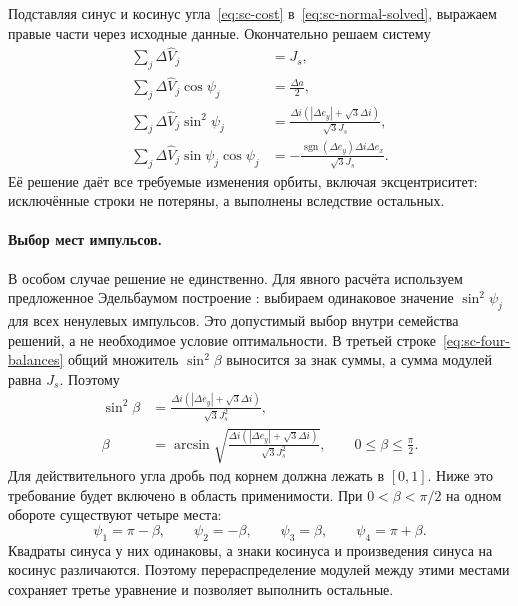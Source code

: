 Подставляя синус и косинус угла~\eqref{eq:sc-cost}
в~\eqref{eq:sc-normal-solved}, выражаем правые части через исходные
данные. Окончательно решаем систему
\begin{equation}
\begin{aligned}
 \sum_j\Delta\widehat V_j&=J_s,\\
 \sum_j\Delta\widehat V_j\cos\psi_j&=\frac{\Delta a}{2},\\
 \sum_j\Delta\widehat V_j\sin^2\psi_j
   &=\frac{\Delta i(|\Delta e_y|+\sqrt3\Delta i)}{\sqrt3J_s},\\
 \sum_j\Delta\widehat V_j\sin\psi_j\cos\psi_j
   &=-\frac{\operatorname{sgn}(\Delta e_y)\Delta i\Delta e_x}{\sqrt3J_s}.
\end{aligned}
\label{eq:sc-four-balances}
\end{equation}
Её решение даёт все требуемые изменения орбиты, включая
эксцентриситет: исключённые строки не потеряны, а выполнены
вследствие остальных.

\paragraph{Выбор мест импульсов.}
В особом случае решение не единственно. Для явного расчёта
используем предложенное Эдельбаумом построение
\cite[с.~56]{edelbaum}: выбираем одинаковое значение
$\sin^2\psi_j$ для всех ненулевых импульсов.
Это допустимый выбор внутри семейства решений, а не необходимое
условие оптимальности. В третьей строке~\eqref{eq:sc-four-balances}
общий множитель $\sin^2\beta$ выносится за знак суммы,
а сумма модулей равна $J_s$. Поэтому
\begin{equation}
 \begin{aligned}
 \sin^2\beta&=\frac{\Delta i(|\Delta e_y|+\sqrt3\Delta i)}{\sqrt3J_s^2},\\
 \beta&=\arcsin\sqrt{\frac{\Delta i(|\Delta e_y|+\sqrt3\Delta i)}
                              {\sqrt3J_s^2}},\qquad
                         0\leq\beta\leq\frac\pi2.
 \end{aligned}
 \label{eq:sc-angle}
\end{equation}
Для действительного угла дробь под корнем должна лежать в $[0,1]$.
Ниже это требование будет включено в область применимости.
При $0<\beta<\pi/2$ на одном обороте существуют четыре места:
\begin{equation}
 \psi_1=\pi-\beta,\qquad\psi_2=-\beta,\qquad
 \psi_3=\beta,\qquad\psi_4=\pi+\beta.
 \label{eq:sc-four-angles}
\end{equation}
Квадраты синуса у них одинаковы, а знаки косинуса и произведения
синуса на косинус различаются. Поэтому перераспределение модулей
между этими местами сохраняет третье уравнение и позволяет
выполнить остальные.

